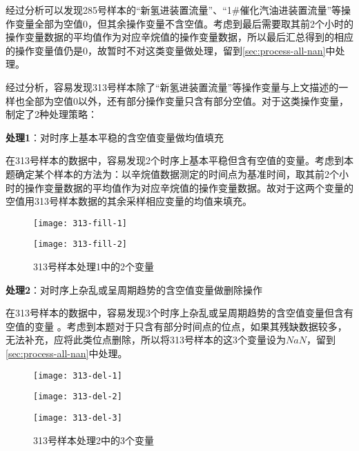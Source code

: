 \documentclass[bwprint]{gmcmthesis}
\begin{document}
经过分析可以发现285号样本的“新氢进装置流量”、“1\#催化汽油进装置流量”等操作变量全部为空值0，但其余操作变量不含空值。考虑到最后需要取其前2个小时的操作变量数据的平均值作为对应辛烷值的操作变量数据，所以最后汇总得到的相应的操作变量值仍是0，故暂时不对这类变量做处理，留到\ref{sec:process-all-nan}中处理。

经过分析，容易发现313号样本除了“新氢进装置流量”等操作变量与上文描述的一样也全部为空值0以外，还有部分操作变量只含有部分空值。对于这类操作变量，制定了2种处理策略：

\textbf{处理1}：对时序上基本平稳的含空值变量做均值填充

在313号样本的数据中，容易发现2个时序上基本平稳但含有空值的变量。考虑到本题确定某个样本的方法为：以辛烷值数据测定的时间点为基准时间，取其前2个小时的操作变量数据的平均值作为对应辛烷值的操作变量数据。故对于这两个变量的空值用313号样本数据的其余采样相应变量的均值来填充。


\begin{figure}[htb]
    \centering
    \begin{minipage}[c]{0.35\textwidth}
        \centering
        \texttt{[image: 313-fill-1]}
    \end{minipage}
    \begin{minipage}[c]{0.35\textwidth}
        \centering
        \texttt{[image: 313-fill-2]}
    \end{minipage}
    \caption{313号样本处理1中的2个变量}
\end{figure}


\textbf{处理2}：对时序上杂乱或呈周期趋势的含空值变量做删除操作

在313号样本的数据中，容易发现3个时序上杂乱或呈周期趋势的含空值变量但含有空值的变量 。考虑到本题对于只含有部分时间点的位点，如果其残缺数据较多，无法补充，应将此类位点删除，所以将313号样本的这3个变量设为$NaN$，留到\ref{sec:process-all-nan}中处理。



\begin{figure}[htb]
    \centering
    \begin{minipage}[c]{0.35\textwidth}
        \centering
        \texttt{[image: 313-del-1]}
    \end{minipage}
    \begin{minipage}[c]{0.35\textwidth}
        \centering
        \texttt{[image: 313-del-2]}
    \end{minipage}
     \begin{minipage}[c]{0.35\textwidth}
        \centering
        \texttt{[image: 313-del-3]}
    \end{minipage}
    \caption{313号样本处理2中的3个变量}
\end{figure}
\end{document}
